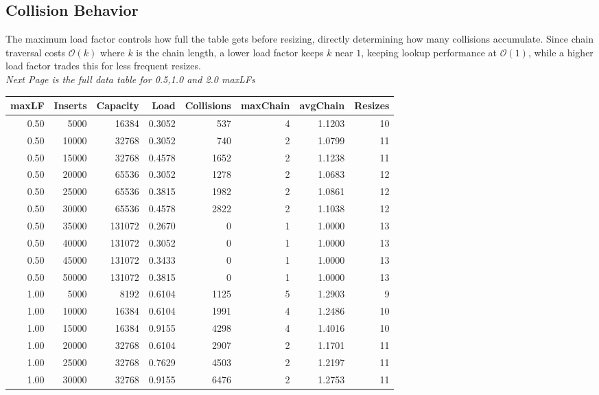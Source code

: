 \documentclass{article}
\begin{document}
\subsection{Collision Behavior}
The maximum load factor controls how full the table gets before resizing, directly 
determining how many collisions accumulate. Since chain traversal costs $\mathcal{O}(k)$ where 
$k$ is the chain length, a lower load factor keeps $k$ near $1$, keeping 
lookup performance at $\mathcal{O}(1)$, while a higher load factor trades this for less frequent resizes.\\

\textit{Next Page is the full data table for 0.5,1.0 and 2.0 maxLFs}
\begin{table}[h]
\centering
\renewcommand{\arraystretch}{1.2}
\begin{tabular}{|r|r|r|r|r|r|r|r|}
\hline
\textbf{maxLF} & \textbf{Inserts} & \textbf{Capacity} & \textbf{Load} & \textbf{Collisions} & \textbf{maxChain} & \textbf{avgChain} & \textbf{Resizes} \\
\hline
0.50 & 5000  & 16384  & 0.3052 & 537   & 4 & 1.1203 & 10 \\
0.50 & 10000 & 32768  & 0.3052 & 740   & 2 & 1.0799 & 11 \\
0.50 & 15000 & 32768  & 0.4578 & 1652  & 2 & 1.1238 & 11 \\
0.50 & 20000 & 65536  & 0.3052 & 1278  & 2 & 1.0683 & 12 \\
0.50 & 25000 & 65536  & 0.3815 & 1982  & 2 & 1.0861 & 12 \\
0.50 & 30000 & 65536  & 0.4578 & 2822  & 2 & 1.1038 & 12 \\
0.50 & 35000 & 131072 & 0.2670 & 0     & 1 & 1.0000 & 13 \\
0.50 & 40000 & 131072 & 0.3052 & 0     & 1 & 1.0000 & 13 \\
0.50 & 45000 & 131072 & 0.3433 & 0     & 1 & 1.0000 & 13 \\
0.50 & 50000 & 131072 & 0.3815 & 0     & 1 & 1.0000 & 13 \\
\hline
1.00 & 5000  & 8192   & 0.6104 & 1125  & 5 & 1.2903 & 9  \\
1.00 & 10000 & 16384  & 0.6104 & 1991  & 4 & 1.2486 & 10 \\
1.00 & 15000 & 16384  & 0.9155 & 4298  & 4 & 1.4016 & 10 \\
1.00 & 20000 & 32768  & 0.6104 & 2907  & 2 & 1.1701 & 11 \\
1.00 & 25000 & 32768  & 0.7629 & 4503  & 2 & 1.2197 & 11 \\
1.00 & 30000 & 32768  & 0.9155 & 6476  & 2 & 1.2753 & 11 \\

\end{tabular}
\end{table}
\end{document}
